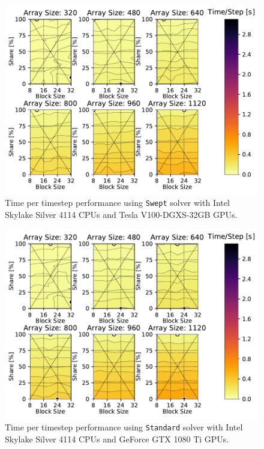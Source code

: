 \documentclass[mca,article,submit,moreauthors,pdftex]{Definitions/mdpi}
\def\Swept{\texttt{Swept}}
\def\Standard{\texttt{Standard}}
\def\oldCPU{Intel Skylake Silver 4114} %
\def\oldGPU{GeForce GTX 1080 Ti}
\def\newGPU{Tesla V100-DGXS-32GB}
\begin{document}
\begin{figure}[htbp]
    \widefigure
    \includegraphics[scale=0.85]{figs/timePerStepSweptheatOld.pdf}
    \caption{Time per timestep performance using \Swept{} solver with \oldCPU{} CPUs and \newGPU{} GPUs.}
    \label{fig:tptOldHeatSwept} 
\end{figure}

\begin{figure}[htbp]
    \widefigure
    \includegraphics[scale=0.85]{figs/timePerStepStandardheatOld.pdf}
    \caption{Time per timestep performance using \Standard{} solver with \oldCPU{} CPUs and \oldGPU{} GPUs.}
    \label{fig:tptOldHeatStandard} 
\end{figure}
\end{document}
